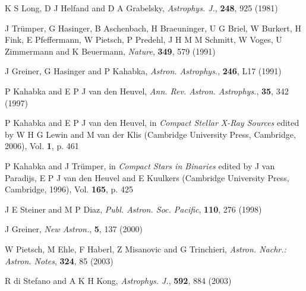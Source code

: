 %

\newcommand{\Nat}{Nature}
\newcommand{\AnA}{Astron. Astrophys.}
\newcommand{\AnASS}{Astron. Astrophys. Suppl. Series}
\newcommand{\ARAA}{Ann. Rev. Astron. Astrophys.}
\newcommand{\ApJ}{Astrophys. J.}
\newcommand{\PASP}{Publ. Astron. Soc. Pacific}
\newcommand{\NA}{New Astron.}
\newcommand{\ANAN}{Astron. Nachr.: Astron. Notes}
\newcommand{\MNRAS}{Mon. Not. R. Astron. Soc.}
\newcommand{\ASR}{Adv. Space Res.}
\newcommand{\RMP}{Rev. Mod. Phys.}
\newcommand{\Pram}{Pramana}
\newcommand{\SAM}{Stellar Atmos. Modeling}
\newcommand{\JCAM}{J. Comput. Appl. Math.}
\newcommand{\AJET}{ADBU J. Eng. Technol.}
\newcommand{\ARX}{arXiv preprint}

\begin{thebibliography}{100}
	K S Long, D J Helfand and D A Grabelsky, \textit{\ApJ}, \textbf{248}, 925 (1981)
	
	J Tr{\"u}mper, G Hasinger, B Aschenbach, H Braeuninger, U G Briel, W Burkert, H Fink, E Pfeffermann, W Pietsch, P Predehl, J H M M Schmitt, W Voges, U Zimmermann and K Beuermann, \textit{\Nat}, \textbf{349}, 579 (1991)
	
	J Greiner, G Hasinger and P Kahabka, \textit{\AnA}, \textbf{246}, L17 (1991)
	
	P Kahabka and E P J van den Heuvel, \textit{\ARAA}, \textbf{35}, 342 (1997)
	
	P Kahabka and E P J van den Heuvel, in \textit{Compact Stellar X-Ray Sources} edited by W H G Lewin and M van der Klis (Cambridge University Press, Cambridge, 2006), Vol. \textbf{1}, p. 461

	P Kahabka and J Tr{\"u}mper, in \textit{Compact Stars in Binaries} edited by J van Paradijs, E P J van den Heuvel and E Kuulkers (Cambridge University Press, Cambridge, 1996), Vol. \textbf{165}, p. 425

	J E Steiner and M P Diaz, \textit{\PASP}, \textbf{110}, 276 (1998)

	J Greiner, \textit{\NA}, \textbf{5}, 137 (2000)

	W Pietsch, M Ehle, F Haberl, Z Misanovic and G Trinchieri, \textit{\ANAN}, \textbf{324}, 85 (2003)

	R di Stefano and A K H Kong, \textit{\ApJ}, \textbf{592}, 884 (2003)


\end{thebibliography}
